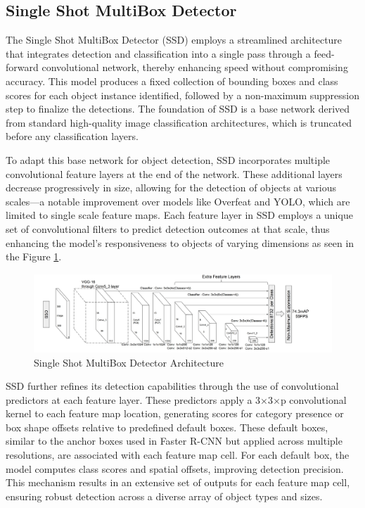 \newpage
\subsection{Single Shot MultiBox Detector}

The Single Shot MultiBox Detector (SSD) \cite{ssd} employs a streamlined architecture that integrates detection and classification into a single pass through a 
feed-forward convolutional network, thereby enhancing speed without compromising accuracy. This model produces a fixed collection of bounding boxes and 
class scores for each object instance identified, followed by a non-maximum suppression step to finalize the detections. The foundation of SSD is a 
base network derived from standard high-quality image classification architectures, which is truncated before any classification layers. 

To adapt this base network for object detection, SSD incorporates multiple convolutional feature layers at the end of the network. These additional layers 
decrease progressively in size, allowing for the detection of objects at various scales—a notable improvement over models like Overfeat and YOLO, which 
are limited to single scale feature maps. Each feature layer in SSD employs a unique set of convolutional filters to predict detection outcomes at that scale, 
thus enhancing the model's responsiveness to objects of varying dimensions as seen in the Figure \ref{fig:ssmd}.

\begin{figure}[h!]
    \centering
    \includegraphics[scale=0.55]{Figures/ssmbd.jpg}
    \caption{Single Shot MultiBox Detector Architecture \cite{ssd}}
    \label{fig:ssmd}
\end{figure}

SSD further refines its detection capabilities through the use of convolutional predictors at each feature layer. These predictors apply a 3×3×p 
convolutional kernel to each feature map location, generating scores for category presence or box shape offsets relative to predefined default boxes. 
These default boxes, similar to the anchor boxes used in Faster R-CNN but applied across multiple resolutions, are associated with each feature map cell. 
For each default box, the model computes class scores and spatial offsets, improving detection precision. This mechanism results in an extensive set of outputs 
for each feature map cell, ensuring robust detection across a diverse array of object types and sizes.





